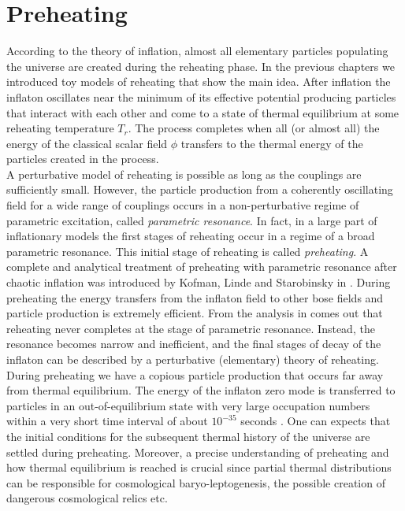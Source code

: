 \documentclass[11pt,a4paper,twoside]{book}
\begin{document}
\chapter{Preheating}
According to the theory of inflation, almost all elementary particles populating the universe are created during the reheating phase. In the previous chapters we introduced toy models of reheating that show the main idea. After inflation the inflaton oscillates near the minimum of its effective potential producing  particles that interact with each other and come to a state of thermal equilibrium at some reheating temperature $ T_{r} $. The process completes when all (or almost all) the energy of the classical scalar field $\phi$ transfers to the thermal energy of the  particles created in the process. \\
A perturbative model of reheating is possible as long as the couplings are sufficiently small. However, the particle production from a coherently oscillating field for a wide range of couplings occurs in a non-perturbative regime of parametric excitation, called \textit{parametric resonance}. In fact, in a large part of inflationary models the first stages of reheating occur in a regime of a broad parametric resonance. This initial stage of reheating is called \textit{preheating}. A complete and analytical treatment of  preheating with parametric resonance after chaotic inflation  was introduced by Kofman, Linde and Starobinsky in \cite{Chap4:LindePreheatingModel}. During preheating the energy transfers from the inflaton field to other bose fields and particle production is extremely efficient. From the analysis in \cite{Chap4:LindePreheatingModel} comes out that reheating never completes at the stage of parametric resonance. Instead, the resonance becomes narrow and inefficient, and the final stages of  decay of the inflaton  can be described by a perturbative (elementary) theory of reheating. During preheating we have a copious particle production that occurs far away from thermal equilibrium. The energy of the inflaton zero mode is transferred to particles in an out-of-equilibrium state with very large occupation numbers within a very short time interval of about $ 10^{-35} $ seconds \cite{Chap7:Peloso_Thermalitation}. One can expects that the initial conditions for the subsequent thermal history of the universe are settled during preheating. Moreover, a precise understanding of preheating and how thermal equilibrium is reached is crucial since partial thermal distributions can be responsible for cosmological baryo-leptogenesis, the possible creation of dangerous cosmological relics etc.\\
\end{document}
